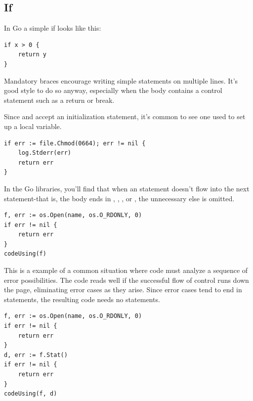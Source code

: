 \subsection{If}
In Go a simple if looks like this:
\begin{lstlisting}
if x > 0 {
    return y
}
\end{lstlisting}
Mandatory braces encourage writing simple  statements on multiple
lines. It's good style to do so anyway, especially when the body
contains a control statement such as a return or break.

Since  and  accept an initialization statement, it's common to
see one used to set up a local variable.

\begin{lstlisting}
if err := file.Chmod(0664); err != nil {
    log.Stderr(err)
    return err
}
\end{lstlisting}
In the Go libraries, you'll find that when an  statement doesn't flow
into the next statement-that is, the body ends in ,
, ,
or , the unnecessary else is omitted.

\begin{lstlisting}
f, err := os.Open(name, os.O_RDONLY, 0)
if err != nil {
    return err
}
codeUsing(f)
\end{lstlisting}
This is a example of a common situation where code must analyze a
sequence of error possibilities. The code reads well if the successful
flow of control runs down the page, eliminating error cases as they
arise. Since error cases tend to end in  statements, the resulting
code needs no  statements.
\begin{lstlisting}
f, err := os.Open(name, os.O_RDONLY, 0)
if err != nil {
    return err
}
d, err := f.Stat()
if err != nil {
    return err
}
codeUsing(f, d)
\end{lstlisting}

